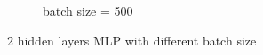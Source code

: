 \documentclass[12pt,letterpaper]{article}
\begin{document}
\begin{figure}[h]
\begin{subfigure}{0.32\textwidth}
    \caption{\small batch size = 500} \label{fig:b}
    \end{subfigure}
    \caption{2 hidden layers MLP with different batch size} \label{fig:MLPbatch}
\end{figure}
\end{document}
